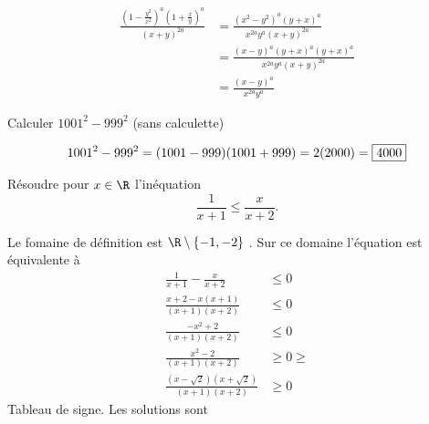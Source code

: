 \documentclass[a4paper, 11pt,reqno]{article}
\begin{document}
\begin{correction}
\begin{align*}
\frac{\left(1-\frac{y^2}{x^2}\right)^a\left(1+\frac{x}{y}\right)^a }{(x+y)^{2a}} &=\frac{\left(x^2-y^2\right)^a\left(y+x\right)^a }{x^{2a}y^a(x+y)^{2a}}\\
&=\frac{\left(x-y\right)^a\left(y+x\right)^a\left(y+x\right)^a }{x^{2a}y^a(x+y)^{2a}}\\
&=\frac{\left(x-y\right)^a }{x^{2a}y^a}
\end{align*}

\begin{center}
\end{center}

\end{correction}



\begin{exercice}
Calculer $1001^2-999^2$ (sans calculette)
\end{exercice}


\begin{correction}
$$1001^2-999^2 =  (1001-999)(1001+999) = 2 (2000)=\fbox{4000}$$
\end{correction}











\begin{exercice}
Résoudre pour $x \in \R$ l'inéquation $$\frac{1}{x+1}\leq \frac{x}{x+2}.$$
\end{exercice}



\begin{correction}
Le fomaine de définition est $\R\setminus\{ -1, -2\}$ . Sur ce domaine l'équation est équivalente à 
\begin{align*}
\frac{1}{x+1}-\frac{x}{x+2}&\leq 0\\
\frac{x+2-x(x+1)}{(x+1)(x+2)}&\leq 0\\
\frac{-x^2+2}{(x+1)(x+2)}&\leq 0\\
\frac{x^2-2}{(x+1)(x+2)}&\geq 0\geq\\
\frac{(x-\sqrt{2})(x+\sqrt{2})}{(x+1)(x+2)}&\geq 0
\end{align*}
Tableau de signe. 
Les solutions sont 
\begin{center}
\fbox{$\cS =]-\infty, -2[\cup [-\sqrt{2}, -1[\cup [\sqrt{2}, +\infty[$. }
\end{center}


\end{correction}
\end{document}
